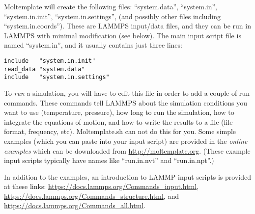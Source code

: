 \documentclass[11pt]{article}
\begin{document}
Moltemplate will create the following files: 
``system.data'',
``system.in'',
``system.in.init'',
``system.in.settings'',
(and possibly other files including ``system.in.coords''). 
These are LAMMPS input/data files, and they can be run in LAMMPS 
with minimal modification (see below).
The main input script file is named ``system.in'', and it usually contains
just three lines:
\begin{verbatim}
include   "system.in.init"
read_data "system.data"
include   "system.in.settings"
\end{verbatim}

To \textit{run} a simulation, you will have to 
edit this file in order to add a couple of run commands.  
These commands tell LAMMPS about the simulation conditions
you want to use (temperature, pressure), 
how long to run the simulation,
how to integrate the equations of motion,
and how to write the results to a file (file format, frequency, etc).
Moltemplate.sh can not do this for you.
Some simple examples (which you can paste into your input script)
are provided in the 
\textit{online examples} 
which can be downloaded from \url{http://moltemplate.org}.
(These example input scripts 
 typically have names like ``run.in.nvt'' and ``run.in.npt''.)

   In addition to the examples, an introduction to LAMMP 
input scripts is provided at these links:
\url{https://docs.lammps.org/Commands_input.html},
\url{https://docs.lammps.org/Commands_structure.html}, and
\url{https://docs.lammps.org/Commands_all.html}.
\end{document}
